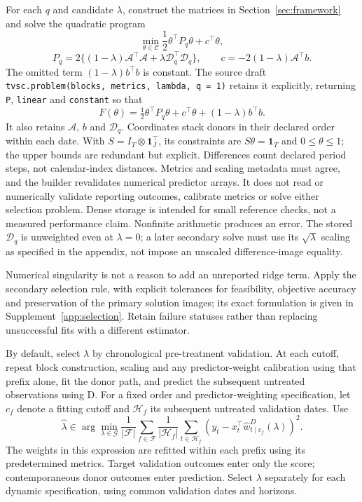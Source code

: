 \documentclass[11pt]{article}
\begin{document}
For each $q$ and candidate $\lambda$, construct the matrices in
Section~\ref{sec:framework} and solve the quadratic program
\[
 \min_{\theta\in\mathcal C}\frac12\theta^\top P_q\theta+c^\top\theta,
\]
\[
 P_q=2\{(1-\lambda)\mathcal A^\top\mathcal A+
                      \lambda\mathcal D_q^\top\mathcal D_q\},
 \qquad c=-2(1-\lambda)\mathcal A^\top b.
\]
The omitted term $(1-\lambda)b^\top b$ is constant. The source draft
\texttt{tvsc.problem(blocks, metrics, lambda, q = 1)} retains it explicitly,
returning \texttt{P}, \texttt{linear} and \texttt{constant} so that
\[
 F(\theta)=\tfrac12\theta^\top P_q\theta+c^\top\theta
                         +(1-\lambda)b^\top b.
\]
It also retains $\mathcal A$, $b$ and $\mathcal D_q$. Coordinates stack
donors in their declared order within each date. With
$S=I_T\otimes\mathbf1_J^\top$, its constraints are
$S\theta=\mathbf1_T$ and $0\leq\theta\leq1$; the upper bounds are
redundant but explicit. Differences count declared period steps, not
calendar-index distances. Metrics and scaling metadata must agree, and
the builder revalidates numerical predictor arrays. It does not read or
numerically validate reporting outcomes, calibrate metrics or solve either
selection problem. Dense storage is intended for small reference checks,
not a measured performance claim. Nonfinite arithmetic produces an error.
The stored $\mathcal D_q$ is unweighted even at $\lambda=0$; a later
secondary solve must use its $\sqrt\lambda$ scaling as specified in the
appendix, not impose an unscaled difference-image equality.

Numerical singularity is not a
reason to add an unreported ridge term. Apply the secondary selection
rule, with explicit tolerances for feasibility, objective accuracy and
preservation of the primary solution images; its exact formulation is
given in Supplement~\ref{app:selection}. Retain failure statuses rather
than replacing unsuccessful fits with a different estimator.

By default, select $\lambda$ by chronological pre-treatment validation.
At each cutoff, repeat block construction, scaling and any
predictor-weight calibration using that prefix alone, fit the donor path,
and predict the subsequent untreated observations using D. For a fixed
order and predictor-weighting specification, let $c_f$ denote a fitting
cutoff and $\mathcal H_f$ its subsequent untreated validation dates. Use
\begin{equation}\label{eq:lambda-validation}
 \widehat\lambda\in\arg\min_{\lambda\in\mathcal G}
 \frac1{|\mathcal F|}\sum_{f\in\mathcal F}\frac1{|\mathcal H_f|}
 \sum_{t\in\mathcal H_f}
 \left(y_t-x_t^\top\widehat w^D_{t\mid c_f}(\lambda)\right)^2.
\end{equation}
The weights in this expression are refitted within each prefix using its
predetermined metrics. Target validation outcomes enter only the score;
contemporaneous donor outcomes enter prediction. Select $\lambda$ separately
for each dynamic specification, using common validation dates and horizons.
\end{document}
